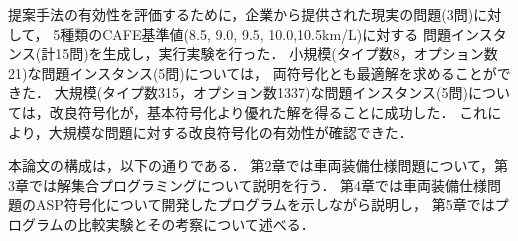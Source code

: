 提案手法の有効性を評価するために，企業から提供された現実の問題(3問)に対して，
5種類のCAFE基準値(8.5, 9.0, 9.5, 10.0,10.5km/L)に対する
問題インスタンス(計15問)を生成し，実行実験を行った．
%
小規模(タイプ数8，オプション数21)な問題インスタンス(5問)については，
両符号化とも最適解を求めることができた．
大規模(タイプ数315，オプション数1337)な問題インスタンス(5問)につい
ては，改良符号化が，基本符号化より優れた解を得ることに成功した．
これにより，大規模な問題に対する改良符号化の有効性が確認できた．

本論文の構成は，以下の通りである．
第2章では車両装備仕様問題について，第3章では解集合プログラミングについて説明を行う．
第4章では車両装備仕様問題のASP符号化について開発したプログラムを示しながら説明し，
第5章ではプログラムの比較実験とその考察について述べる．







